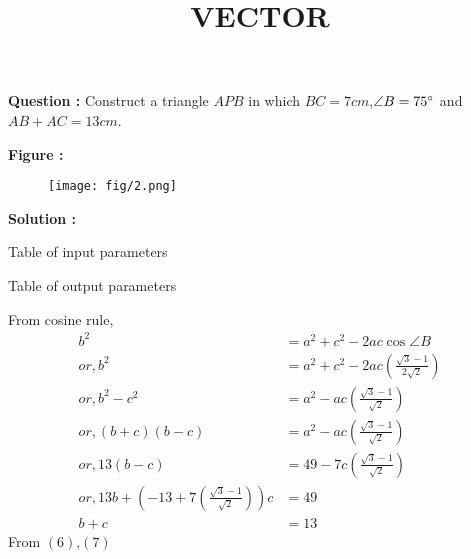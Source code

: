 \documentclass[12pt]{article}
\providecommand{\brak}[1]{\ensuremath{\left(#1\right)}}
\begin{document}
\title{\textbf{VECTOR}}
\date{}
\maketitle
\textbf{Question :} Construct a triangle $APB$ in which $BC = 7cm$,$\angle B = 75\degree$ and $AB+AC = 13cm$.

\textbf{Figure :}
\begin{figure}[H]
    \centering
          \texttt{[image: fig/2.png]}
    \caption{}
    \label{fig:fig:1}
\end{figure}

\textbf{Solution :}
\begin{table}[H]
    \centering
    
    \caption{Table of input parameters}
    \label{tab:tab:1}
\end{table} 
\begin{table}[H]
    \centering
    
  \caption{Table of output parameters}
    \label{tab:tab:2}
\end{table}
From cosine rule,
\begin{align}
  b^2&=a^2+c^2-2ac\cos{\angle B} \\
  or,b^2&=a^2+c^2-2ac\brak{\frac{\sqrt{3}-1}{2\sqrt{2}}}\\
  or,b^2-c^2 &=a^2-ac\brak{\frac{\sqrt{3}-1}{\sqrt{2}}}\\
  or,\brak{b+c}\brak{b-c}&=a^2-ac\brak{\frac{\sqrt{3}-{1}}{\sqrt{2}}}\\
  or,13\brak{b-c}&=49-7c\brak{\frac{\sqrt{3}-{1}}{\sqrt{2}}}\\
  or,13b+\brak{-13+7\brak{\frac{\sqrt{3}-1}{\sqrt{2}}}}c&=49\\
  b+c&=13\end{align}
From \brak{6},\brak{7} \\
\end{document}
